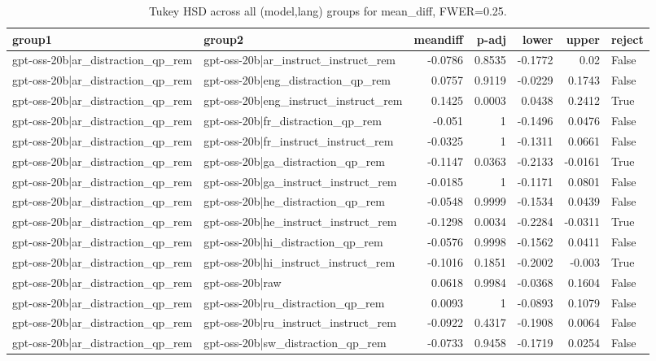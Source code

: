 \begin{table}
\caption{Tukey HSD across all (model,lang) groups for mean_diff, FWER=0.25.}
\label{tab:tukey_all_models_all_langs_mean_diff}
\begin{tabular}{l l r r r r l}
\toprule
group1 & group2 & meandiff & p-adj & lower & upper & reject \\
\midrule
gpt-oss-20b|ar_distraction_qp_rem & gpt-oss-20b|ar_instruct_instruct_rem & -0.0786 & 0.8535 & -0.1772 & 0.02 & False \\
gpt-oss-20b|ar_distraction_qp_rem & gpt-oss-20b|eng_distraction_qp_rem & 0.0757 & 0.9119 & -0.0229 & 0.1743 & False \\
gpt-oss-20b|ar_distraction_qp_rem & gpt-oss-20b|eng_instruct_instruct_rem & 0.1425 & 0.0003 & 0.0438 & 0.2412 & True \\
gpt-oss-20b|ar_distraction_qp_rem & gpt-oss-20b|fr_distraction_qp_rem & -0.051 & 1 & -0.1496 & 0.0476 & False \\
gpt-oss-20b|ar_distraction_qp_rem & gpt-oss-20b|fr_instruct_instruct_rem & -0.0325 & 1 & -0.1311 & 0.0661 & False \\
gpt-oss-20b|ar_distraction_qp_rem & gpt-oss-20b|ga_distraction_qp_rem & -0.1147 & 0.0363 & -0.2133 & -0.0161 & True \\
gpt-oss-20b|ar_distraction_qp_rem & gpt-oss-20b|ga_instruct_instruct_rem & -0.0185 & 1 & -0.1171 & 0.0801 & False \\
gpt-oss-20b|ar_distraction_qp_rem & gpt-oss-20b|he_distraction_qp_rem & -0.0548 & 0.9999 & -0.1534 & 0.0439 & False \\
gpt-oss-20b|ar_distraction_qp_rem & gpt-oss-20b|he_instruct_instruct_rem & -0.1298 & 0.0034 & -0.2284 & -0.0311 & True \\
gpt-oss-20b|ar_distraction_qp_rem & gpt-oss-20b|hi_distraction_qp_rem & -0.0576 & 0.9998 & -0.1562 & 0.0411 & False \\
gpt-oss-20b|ar_distraction_qp_rem & gpt-oss-20b|hi_instruct_instruct_rem & -0.1016 & 0.1851 & -0.2002 & -0.003 & True \\
gpt-oss-20b|ar_distraction_qp_rem & gpt-oss-20b|raw & 0.0618 & 0.9984 & -0.0368 & 0.1604 & False \\
gpt-oss-20b|ar_distraction_qp_rem & gpt-oss-20b|ru_distraction_qp_rem & 0.0093 & 1 & -0.0893 & 0.1079 & False \\
gpt-oss-20b|ar_distraction_qp_rem & gpt-oss-20b|ru_instruct_instruct_rem & -0.0922 & 0.4317 & -0.1908 & 0.0064 & False \\
gpt-oss-20b|ar_distraction_qp_rem & gpt-oss-20b|sw_distraction_qp_rem & -0.0733 & 0.9458 & -0.1719 & 0.0254 & False \\

\end{tabular}
\end{table}
